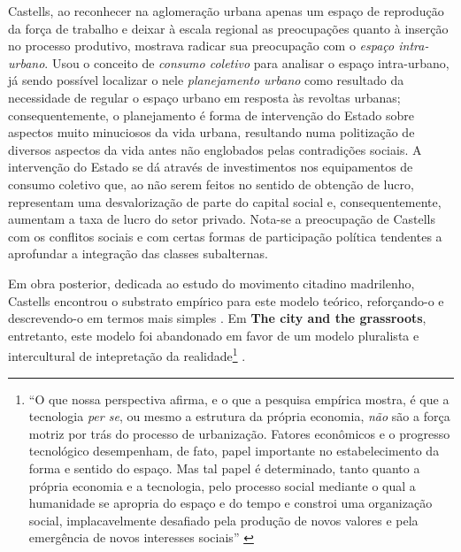 Castells, ao reconhecer na aglomeração urbana apenas um espaço de reprodução da força de trabalho e deixar à escala regional as preocupações quanto à inserção no processo produtivo, mostrava radicar sua preocupação com o \textit{espaço intra-urbano}. Usou o conceito de \textit{consumo coletivo} para analisar o espaço intra-urbano, já sendo possível localizar o nele \textit{planejamento urbano} como resultado da necessidade de regular o espaço urbano em resposta às revoltas urbanas; consequentemente, o planejamento é forma de intervenção do Estado sobre aspectos muito minuciosos da vida urbana, resultando numa politização de diversos aspectos da vida antes não englobados pelas contradições sociais. A intervenção do Estado se dá através de investimentos nos equipamentos de consumo coletivo que, ao não serem feitos no sentido de obtenção de lucro, representam uma desvalorização de parte do capital social e, consequentemente, aumentam a taxa de lucro do setor privado. Nota-se a preocupação de Castells com os conflitos sociais e com certas formas de participação política tendentes a aprofundar a integração das classes subalternas.

Em obra posterior, dedicada ao estudo do movimento citadino madrilenho, Castells encontrou o substrato empírico para este modelo teórico, reforçando-o e descrevendo-o em termos mais simples \cite[p.~20-25]{CASTELLS1980}. Em \textbf{The city and the grassroots}, entretanto, este modelo foi abandonado em favor de um modelo pluralista e intercultural de intepretação da realidade\footnote{``O que nossa perspectiva afirma, e o que a pesquisa empírica mostra, é que a tecnologia \textit{per se}, ou mesmo a estrutura da própria economia, \textit{não} são a força motriz  por trás do processo de urbanização. Fatores econômicos e o progresso tecnológico desempenham, de fato, papel importante no estabelecimento da forma e sentido do espaço. Mas tal papel é determinado, tanto quanto a própria economia e a tecnologia, pelo processo social mediante o qual a humanidade se apropria do espaço e do tempo e constroi uma organização social, implacavelmente desafiado pela produção de novos valores e pela emergência de novos interesses sociais'' \cite[p.~291]{CASTELLS1983}} \cite{CASTELLS1983}.

